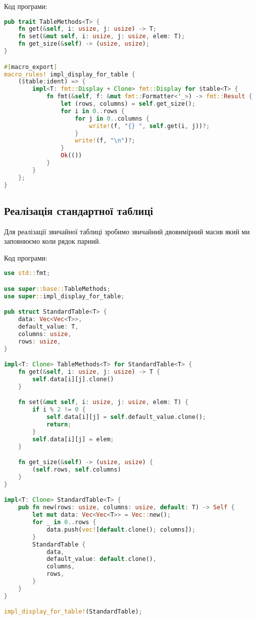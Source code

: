 \noindent
Код програми:
\begin{lstlisting}[language=Rust, style=colouredRust]
pub trait TableMethods<T> {
    fn get(&self, i: usize, j: usize) -> T;
    fn set(&mut self, i: usize, j: usize, elem: T);
    fn get_size(&self) -> (usize, usize);
}

#[macro_export]
macro_rules! impl_display_for_table {
    ($table:ident) => {
        impl<T: fmt::Display + Clone> fmt::Display for $table<T> {
            fn fmt(&self, f: &mut fmt::Formatter<'_>) -> fmt::Result {
                let (rows, columns) = self.get_size();
                for i in 0..rows {
                    for j in 0..columns {
                        write!(f, "{} ", self.get(i, j))?;
                    }
                    write!(f, "\n")?;
                }
                Ok(())
            }
        }
    };
}
\end{lstlisting}


\newpage
\subsection{Реалізація стандартної таблиці}
Для реалізації звичайної таблиці зробимо звичайний двовимірний масив який ми заповнюємо коли рядок парний.

\noindent
Код програми:
\begin{lstlisting}[language=Rust, style=colouredRust]
use std::fmt;

use super::base::TableMethods;
use super::impl_display_for_table;

pub struct StandardTable<T> {
    data: Vec<Vec<T>>,
    default_value: T,
    columns: usize,
    rows: usize,
}

impl<T: Clone> TableMethods<T> for StandardTable<T> {
    fn get(&self, i: usize, j: usize) -> T {
        self.data[i][j].clone()
    }

    fn set(&mut self, i: usize, j: usize, elem: T) {
        if i % 2 != 0 {
            self.data[i][j] = self.default_value.clone();
            return;
        }
        self.data[i][j] = elem;
    }

    fn get_size(&self) -> (usize, usize) {
        (self.rows, self.columns)
    }
}

impl<T: Clone> StandardTable<T> {
    pub fn new(rows: usize, columns: usize, default: T) -> Self {
        let mut data: Vec<Vec<T>> = Vec::new();
        for _ in 0..rows {
            data.push(vec![default.clone(); columns]);
        }
        StandardTable {
            data,
            default_value: default.clone(),
            columns,
            rows,
        }
    }
}

impl_display_for_table!(StandardTable);
\end{lstlisting}


